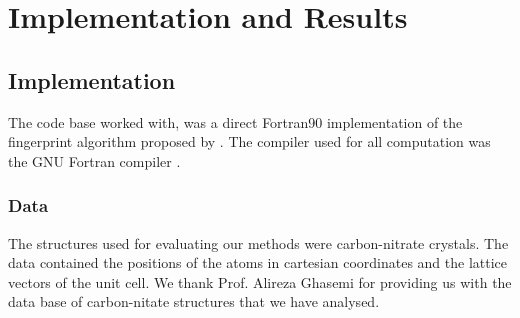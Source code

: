 
\chapter{Implementation and Results} %

\label{Chapter2} %


\section{Implementation}
The code base worked with, was a direct Fortran90 implementation of the fingerprint algorithm proposed by \cite{Zhu2016}. The compiler used for all computation was the GNU Fortran compiler \cite{gnufortran}.

\subsection{Data}
The structures used for evaluating our methods were carbon-nitrate crystals. The data contained the positions of the atoms in cartesian coordinates and the lattice vectors of the unit cell. We thank Prof. Alireza Ghasemi for providing us with the data base of carbon-nitate structures that we have analysed.


